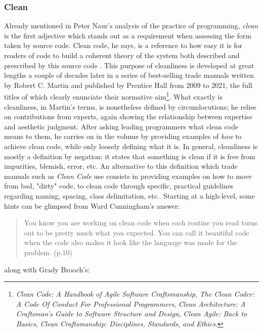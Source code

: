 \subsubsection{Clean}
\label{subsubsec:clean}

Already mentioned in Peter Naur's analysis of the practice of programming, \emph{clean} is the first adjective which stands out as a requirement when assessing the form taken by source code. Clean code, he says, is a reference to how easy it is for readers of code to build a coherent theory of the system both described and prescribed by this source code \citep{naur_programming_1985}. This purpose of cleanliness is developed at great lengths a couple of decades later in a series of best-selling trade manuals written by Robert C. Martin and published by Prentice Hall from 2009 to 2021, the full titles of which clearly enunciate their normative aim\footnote{\emph{Clean Code: A Handbook of Agile Software Craftsmanship}, \emph{The Clean Coder: A Code Of Conduct For Professional Programmers}, \emph{Clean Architecture: A Craftsman's Guide to Software Structure and Design}, \emph{Clean Agile: Back to Basics}, \emph{Clean Craftsmanship: Disciplines, Standards, and Ethics}.}. What exactly is cleanliness, in Martin's terms, is nonetheless defined by circumlocutions; he relies on contributions from experts, again showing the relationship between expertise and aesthetic judgment. After asking leading programmers what clean code means to them, he carries on in the volume by providing examples of \emph{how} to achieve clean code, while only loosely defining what it is. In general, cleanliness is mostly a definition by negation: it states that something is clean if it is free from impurities, blemish, error, etc. An alternative to this definition which trade manuals such as \emph{Clean Code} use consists in providing examples on how to move from bad, "dirty" code, to clean code through specific, practical guidelines regarding naming, spacing, class delimitation, etc.. Starting at a high-level, some hints can be glimpsed from Ward Cunningham's answer:

\begin{quote}
  You know you are working on clean code when each routine you read turns out to be pretty much what you expected. You can call it beautiful code when the code also makes it look like the language was made for the problem. \citep{martin_clean_2008} (p.10)
\end{quote}

along with Grady Brooch's:

